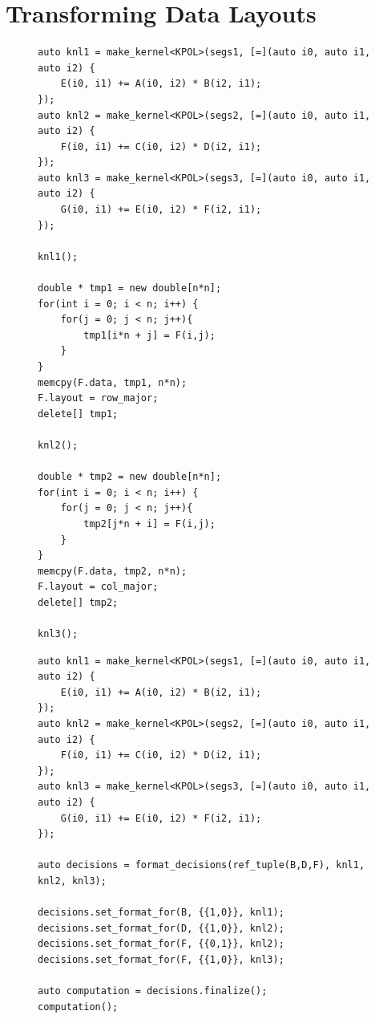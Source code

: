 \documentclass[sigconf,review=true]{acmart}
\newcommand{\FormatDecisions}[0]{{\textsc{FormatDecisions}}}
\begin{document}
\section{Transforming Data Layouts}

\begin{figure}
	\begin{lstlisting}[caption={Changing data layouts for one View in the 3MM benchmark manually.},label={ByHand3MM}]
auto knl1 = make_kernel<KPOL>(segs1, [=](auto i0, auto i1, auto i2) {
	E(i0, i1) += A(i0, i2) * B(i2, i1);
});
auto knl2 = make_kernel<KPOL>(segs2, [=](auto i0, auto i1, auto i2) {
	F(i0, i1) += C(i0, i2) * D(i2, i1);
});
auto knl3 = make_kernel<KPOL>(segs3, [=](auto i0, auto i1, auto i2) {
	G(i0, i1) += E(i0, i2) * F(i2, i1);
});

knl1();

double * tmp1 = new double[n*n];
for(int i = 0; i < n; i++) {
	for(j = 0; j < n; j++){
		tmp1[i*n + j] = F(i,j);
	}
}
memcpy(F.data, tmp1, n*n);
F.layout = row_major;
delete[] tmp1;

knl2();

double * tmp2 = new double[n*n];
for(int i = 0; i < n; i++) {
	for(j = 0; j < n; j++){
		tmp2[j*n + i] = F(i,j);
	}
}
memcpy(F.data, tmp2, n*n);
F.layout = col_major;
delete[] tmp2;

knl3();
	\end{lstlisting}
\end{figure}

\begin{figure}
\begin{lstlisting}[caption={Changing data layouts for three Views in the 3MM benchmark using \FormatDecisions.},
	label={FormatDecisions3MM}]
auto knl1 = make_kernel<KPOL>(segs1, [=](auto i0, auto i1, auto i2) {
	E(i0, i1) += A(i0, i2) * B(i2, i1);
});
auto knl2 = make_kernel<KPOL>(segs2, [=](auto i0, auto i1, auto i2) {
	F(i0, i1) += C(i0, i2) * D(i2, i1);
});
auto knl3 = make_kernel<KPOL>(segs3, [=](auto i0, auto i1, auto i2) {
	G(i0, i1) += E(i0, i2) * F(i2, i1);
});

auto decisions = format_decisions(ref_tuple(B,D,F), knl1, knl2, knl3);

decisions.set_format_for(B, {{1,0}}, knl1);
decisions.set_format_for(D, {{1,0}}, knl2);
decisions.set_format_for(F, {{0,1}}, knl2);
decisions.set_format_for(F, {{1,0}}, knl3);

auto computation = decisions.finalize();
computation();
\end{lstlisting}
\end{figure}
\end{document}
